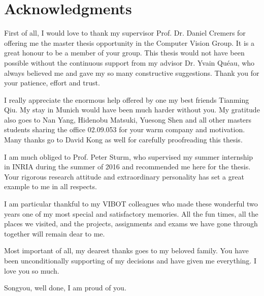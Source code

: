 \doublespacing

\setcounter{page}{1} \pagestyle{plain}


\tableofcontents

\listoffigures
\listoftables

\chapter*{Acknowledgments}
         {\protect{}}

First of all, I would love to thank my supervisor Prof. Dr. Daniel Cremers for offering me the master thesis opportunity in the Computer Vision Group. 
It is a great honour to be a member of your group. 
This thesis would not have been possible without the continuous support from my advisor Dr. Yvain Qu\'{e}au, who always believed me and gave my so many constructive suggestions. 
Thank you for your patience, effort and trust.

I really appreciate the enormous help offered by one my best friends Tianming Qiu.
My stay in Munich would have been much harder without you.
My gratitude also goes to Nan Yang, Hidenobu Matsuki, Yuesong Shen and all other masters students sharing the office 02.09.053 for your warm company and motivation. 
Many thanks go to David Kong as well for carefully proofreading this thesis.

I am much obliged to Prof. Peter Sturm, who supervised my summer internship in INRIA during the summer of 2016 and recommended me here for the thesis.
Your rigorous research attitude and extraordinary personality has set a great example to me in all respects.

I am particular thankful to my VIBOT colleagues who made these wonderful two years one of my most special and satisfactory memories.
All the fun times, all the places we visited, and the projects, assignments and exams we have gone through together will remain dear to me.

Most important of all, my dearest thanks goes to my beloved family.
You have been unconditionally supporting of my decisions and have given me everything. I love you so much.

Songyou, well done, I am proud of you.

\pagestyle{fancy}
